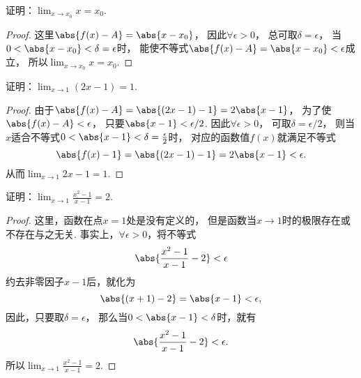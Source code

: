 \begin{example}
证明：\(\lim_{x \to x_0} x = x_0\).
\begin{proof}
这里\(\abs{f(x) - A} = \abs{x - x_0}\)，
因此\(\forall \epsilon > 0\)，
总可取\(\delta = \epsilon\)，
当\(0 < \abs{x - x_0} < \delta = \epsilon\)时，
能使不等式\(\abs{f(x) - A} = \abs{x - x_0} < \epsilon\)成立，
所以\(\lim_{x \to x_0} x = x_0\).
\end{proof}
\end{example}

\begin{example}
证明：\(\lim_{x\to1} (2x-1) = 1\).
\begin{proof}
由于\(\abs{f(x) - A} = \abs{(2x-1) - 1} = 2\abs{x-1}\)，
为了使\(\abs{f(x) - A} < \epsilon\)，
只要\(\abs{x-1}<\epsilon/2\).
因此\(\forall \epsilon > 0\)，
可取\(\delta = \epsilon/2\)，
则当\(x\)适合不等式\(0 < \abs{x-1} < \delta = \frac\epsilon2\)时，
对应的函数值\(f(x)\)就满足不等式\begin{equation*}
	\abs{f(x) - 1} = \abs{(2x-1) - 1} = 2\abs{x-1} < \epsilon.
\end{equation*}
从而\(\lim_{x\to1} 2x-1 = 1\).
\end{proof}
\end{example}

\begin{example}
证明：\(\lim_{x\to1} \frac{x^2-1}{x-1} = 2\).
\begin{proof}
这里，函数在点\(x=1\)处是没有定义的，
但是函数当\(x\to1\)时的极限存在或不存在与之无关.
事实上，\(\forall \epsilon > 0\)，将不等式\begin{equation*}
	\abs{\frac{x^2-1}{x-1} - 2} < \epsilon
\end{equation*}
约去非零因子\(x-1\)后，就化为\begin{equation*}
	\abs{(x+1)-2} = \abs{x-1} < \epsilon,
\end{equation*}
因此，只要取\(\delta = \epsilon\)，
那么当\(0 < \abs{x-1} < \delta\)时，就有\begin{equation*}
	\abs{\frac{x^2-1}{x-1} - 2} < \epsilon.
\end{equation*}
所以\(\lim_{x\to1} \frac{x^2-1}{x-1} = 2\).
\end{proof}
\end{example}

